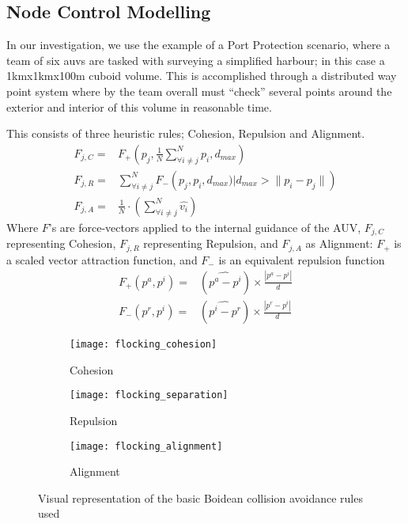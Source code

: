 \subsection{Node Control Modelling}

In our investigation, we use the example of a Port Protection scenario, where a team of six \glspl{auv} are tasked with surveying a simplified harbour; in this case a 1kmx1kmx100m cuboid volume.
This is accomplished through a distributed way point system where by the team overall must ``check'' several points around the exterior and interior of this volume in reasonable time.

This consists of three heuristic rules; Cohesion, Repulsion and Alignment.
\begin{align}
  F_{j,C}=& F_+\left(p_j, \frac{1}{N}\sum\limits_{\forall i \ne j}^N{p_i}, d_{max}\right)\label{eq:fa}\\
  F_{j,R}=& \sum\limits_{\forall i \ne j}^N F_-\left(p_j, p_i, d_{max}) \big| d_{max}>\|p_i-p_j\|\right)\label{eq:fr}\\
  F_{j,A}=& \frac{1}{N}\cdot\left(\sum\limits_{\forall i \ne j}^N \hat{v_i}\right)\label{eq:fc}
\end{align}
Where $F$'s are force-vectors applied to the internal guidance of the AUV, $F_{j,C}$ representing Cohesion, $F_{j,R}$ representing Repulsion, and $F_{j,A}$ as Alignment: $F_+$ is a scaled vector attraction function, and $F_-$ is an equivalent repulsion function
\begin{align}
  F_+(p^a, p^i)=&(\widehat{p^a-p^i}) \times \frac{|p^a-p^i|}{d}\\
  F_-(p^r, p^i)=&(\widehat{p^i-p^r}) \times \frac{|p^r-p^i|}{d}
\end{align}

\begin{figure*}
  \centering
  \begin{subfigure}[t]{0.3\textwidth}
    \centering
    \texttt{[image: flocking\_cohesion]}
    \caption{Cohesion}
  \end{subfigure}
  \begin{subfigure}[t]{0.3\textwidth}
    \centering
    \texttt{[image: flocking\_separation]}
    \caption{Repulsion}
  \end{subfigure}
  \begin{subfigure}[t]{0.3\textwidth}
    \centering
    \texttt{[image: flocking\_alignment]}
    \caption{Alignment}
  \end{subfigure}
  \caption{Visual representation of the basic Boidean collision avoidance rules used}
  \label{fig:boids}
\end{figure*}


